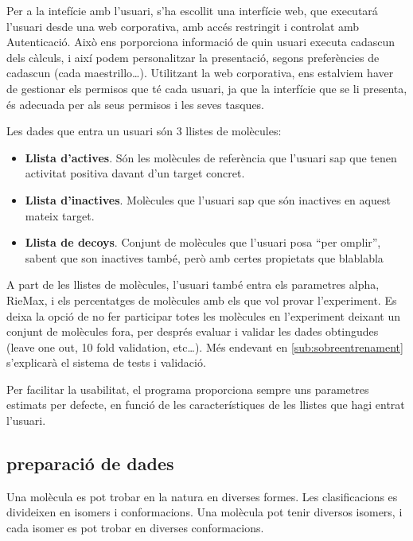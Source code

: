 \documentclass[titlepage,a4paper,12pt]{book}
\begin{document}
Per a la intefície amb l'usuari, s'ha escollit una interfície web, que executará
l'usuari desde una web corporativa, amb accés restringit i controlat amb
Autenticació.  Això ens porporciona informació de quin usuari executa cadascun
dels càlculs, i així podem personalitzar la presentació, segons preferències de
cadascun (cada maestrillo\dots).  Utilitzant la web corporativa, ens estalviem
haver de gestionar els permisos que té cada usuari, ja que la interfície que se
li presenta, és adecuada per als seus permisos i les seves tasques.

Les dades que entra un usuari són 3 llistes de molècules:

\begin{itemize}
	\item \textbf{Llista d'actives}.  Són les molècules de referència que l'usuari sap
	que tenen activitat positiva davant d'un target concret.
	\item \textbf{Llista d'inactives}.  Molècules que l'usuari sap que són inactives en
	aquest mateix target.
	\item \textbf{Llista de decoys}.  Conjunt de molècules que l'usuari posa ``per
	omplir'', sabent que son inactives també, però amb certes propietats que
	blablabla %
\end{itemize}

A part de les llistes de molècules, l'usuari també entra els parametres alpha,
RieMax, i els percentatges de molècules amb els que vol provar l'experiment.  Es
deixa la opció de no fer participar totes les molècules en l'experiment deixant 
un conjunt de molècules fora, per després evaluar i validar les dades obtingudes
(leave one out, 10 fold validation, etc\dots).  Més endevant en 
\ref{sub:sobreentrenament} s'explicarà el sistema de tests i validació.

Per facilitar la usabilitat, el programa proporciona sempre uns parametres
estimats per defecte, en funció de les característiques de les llistes que hagi
entrat l'usuari. 

\subsection{preparació de dades} %
\label{sub:preparacio de dades}
Una molècula es pot trobar en la natura en diverses formes.  Les clasificacions
es divideixen en isomers i conformacions.  Una molècula pot tenir diversos
isomers, i cada isomer es pot trobar en  diverses conformacions.
\end{document}
